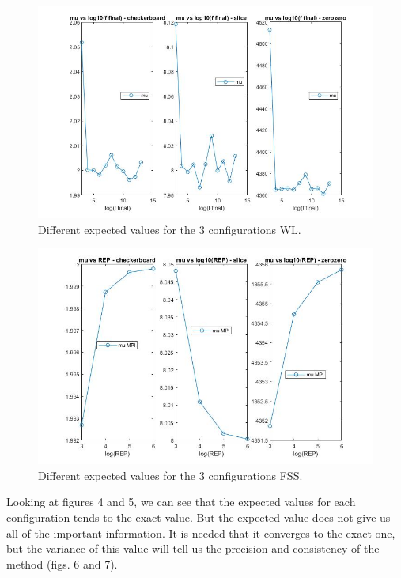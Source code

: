 \documentclass[a4paper, 11pt]{article}
\begin{document}
	\begin{figure}[h]
		\includegraphics[scale=0.3]{mu_WL}
		\centering
		\caption{Different expected values for the 3 configurations WL.}
	\end{figure}
	
	\begin{figure}[h]
		\includegraphics[scale=0.3]{mu_new_rps}
		\centering
		\caption{Different expected values for the 3 configurations FSS.}
	\end{figure}

	
	Looking at figures 4 and 5, we can see that the expected values for each configuration tends to the exact value. But the expected value does not give us all of the important information. It is needed that it converges to the exact one, but the variance of this value will tell us the precision and consistency of the method (figs. 6 and 7).
	
	\newpage
\end{document}
